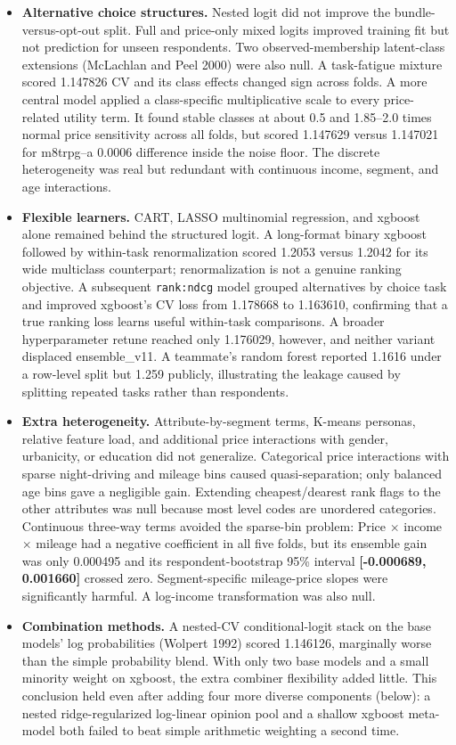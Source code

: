 \documentclass[
  9.5pt,
]{article}
\providecommand{\tightlist}{%
  \setlength{\itemsep}{0pt}\setlength{\parskip}{0pt}}
\begin{document}
\begin{itemize}
\tightlist
\item
  \textbf{Alternative choice structures.} Nested logit did not improve
  the bundle-versus-opt-out split. Full and price-only mixed logits
  improved training fit but not prediction for unseen respondents. Two
  observed-membership latent-class extensions (McLachlan and Peel 2000)
  were also null. A task-fatigue mixture scored 1.147826 CV and its
  class effects changed sign across folds. A more central model applied
  a class-specific multiplicative scale to every price-related utility
  term. It found stable classes at about 0.5 and 1.85--2.0 times normal
  price sensitivity across all folds, but scored 1.147629 versus
  1.147021 for m8trpg--a 0.0006 difference inside the noise floor. The
  discrete heterogeneity was real but redundant with continuous income,
  segment, and age interactions.
\item
  \textbf{Flexible learners.} CART, LASSO multinomial regression, and
  xgboost alone remained behind the structured logit. A long-format
  binary xgboost followed by within-task renormalization scored 1.2053
  versus 1.2042 for its wide multiclass counterpart; renormalization is
  not a genuine ranking objective. A subsequent \texttt{rank:ndcg} model
  grouped alternatives by choice task and improved xgboost's CV loss
  from 1.178668 to 1.163610, confirming that a true ranking loss learns
  useful within-task comparisons. A broader hyperparameter retune
  reached only 1.176029, however, and neither variant displaced
  ensemble\_v11. A teammate's random forest reported 1.1616 under a
  row-level split but 1.259 publicly, illustrating the leakage caused by
  splitting repeated tasks rather than respondents.
\item
  \textbf{Extra heterogeneity.} Attribute-by-segment terms, K-means
  personas, relative feature load, and additional price interactions
  with gender, urbanicity, or education did not generalize. Categorical
  price interactions with sparse night-driving and mileage bins caused
  quasi-separation; only balanced age bins gave a negligible gain.
  Extending cheapest/dearest rank flags to the other attributes was null
  because most level codes are unordered categories. Continuous
  three-way terms avoided the sparse-bin problem: Price \(\times\)
  income \(\times\) mileage had a negative coefficient in all five
  folds, but its ensemble gain was only 0.000495 and its
  respondent-bootstrap 95\% interval \textbf{{[}-0.000689, 0.001660{]}}
  crossed zero. Segment-specific mileage-price slopes were significantly
  harmful. A log-income transformation was also null.
\item
  \textbf{Combination methods.} A nested-CV conditional-logit stack on
  the base models' log probabilities (Wolpert 1992) scored 1.146126,
  marginally worse than the simple probability blend. With only two base
  models and a small minority weight on xgboost, the extra combiner
  flexibility added little. This conclusion held even after adding four
  more diverse components (below): a nested ridge-regularized log-linear
  opinion pool and a shallow xgboost meta-model both failed to beat
  simple arithmetic weighting a second time.
\end{itemize}
\end{document}
